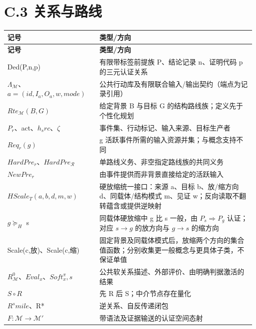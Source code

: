 \documentclass[UTF8,a4paper,zihao=-4,fontset=windows,openany]{ctexbook}
\def\mathrm#1{#1}%
\begin{document}
\section{C.3 关系与路线}
\begingroup\small\setlength{\tabcolsep}{4pt}
\begin{longtable}{>{\raggedright\arraybackslash}p{}>{\raggedright\arraybackslash}p{}}
\toprule
\textbf{记号} & \textbf{类型/方向} \\
\midrule
\endfirsthead
\toprule
\textbf{记号} & \textbf{类型/方向} \\
\midrule
\endhead
\bottomrule
\endfoot
\bottomrule
\endlastfoot
Ded(P,n,p) & 有限带标签前提族 P、结论记录 n、证明代码 p 的三元认证关系 \\
\(\Lambda_\mathcal{M}\)、\(a=(\mathrm{id},I_a,O_a,w,\mathrm{mode})\) & 公共行动库及有限联合输入/输出契约（端点为记录引用） \\
\(\mathrm{Rte}_\mathcal{M}(B,G)\) & 给定背景 B 与目标 G 的结构路线族；定义先于个性化规划 \\
\(P_r\)、act、\(h_\mathrm{src}\)、\(\zeta\) & 事件集、行动标记、输入来源、目标生产者 \\
\(\mathrm{Req}_r(g)\) & g 活跃事件所需的输入资源并集；与概念支持不同 \\
\(\mathrm{HardPre}_r\)、\(\mathrm{HardPre}_\mathcal{R}\) & 单路线义务、非空指定路线族的共同义务 \\
\(\mathrm{NewPre}_r\) & 由事件提供而非背景直接给定的活跃输入 \\
\(\mathrm{HScale}_T(a,b,d,m,w)\) & 硬放缩统一接口：来源 a、目标 b、放/缩方向 d、同载体/结构模式 m、见证 w；反向读取不翻转蕴含或提供逆映射 \\
\(g\succeq_H\) s & 同载体硬放缩中 g 比 s 一般，由 \(P_s\Rightarrow P_g\) 认证；对应 \(s\to g\) 的放方向与 \(g\to s\) 的缩方向 \\
Scale(c,放)、Scale(c,缩) & 固定背景及同载体模式后，放缩两个方向的集合值函数；分别收集更一般概念与更具体子类，不保证单值 \\
\(R^{0}_\mathcal{M}\)、\(\mathrm{Eval}_x\)、\(\mathrm{Soft}^\pi_x,s\) & 公共软关系描述、外部评价、由明确判据激活的结果 \\
\(S\circ R\) & 先 R 后 S；中介节点存在量化 \\
\(R^\mathrm{smile}\)、R* & 逆关系、自反传递闭包 \\
\(F:\mathcal{M}\to\mathcal{M}'\) & 带语法及证据输送的认证空间态射 \\
\end{longtable}
\endgroup
\end{document}
